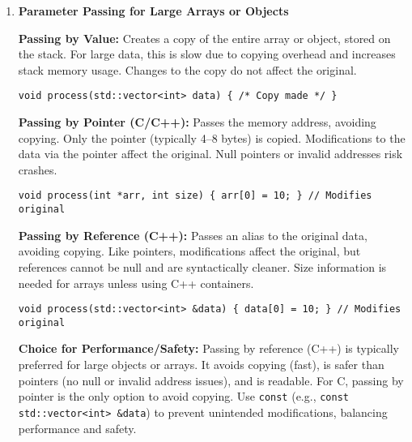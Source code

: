 \documentclass[a4paper,12pt]{article}
\begin{document}
\begin{enumerate}
\textbf{Header Files:} Prototypes are typically placed in header files (\texttt{.h}) to share declarations across multiple source files. The header is included in source files, and definitions are provided in one source file to avoid multiple definition errors.

\begin{lstlisting}
// sum.h
#ifndef SUM_H
#define SUM_H
int sum(int a, int b);
#endif

// sum.c
#include "sum.h"
int sum(int a, int b) {
    return a + b;
}

// main.c
#include "sum.h"
int main() {
    printf("%d\n", sum(3, 4));
    return 0;
}
\end{lstlisting}

\textbf{Forward Declarations:} Prototypes allow functions to call each other regardless of definition order within a file.

\textbf{Linking:} The linker combines object files, resolving function calls to their definitions. Missing definitions cause linker errors.

\item \textbf{Parameter Passing for Large Arrays or Objects}

\textbf{Passing by Value:} Creates a copy of the entire array or object, stored on the stack. For large data, this is slow due to copying overhead and increases stack memory usage. Changes to the copy do not affect the original.

\begin{lstlisting}
void process(std::vector<int> data) { /* Copy made */ }
\end{lstlisting}

\textbf{Passing by Pointer (C/C++):} Passes the memory address, avoiding copying. Only the pointer (typically 4–8 bytes) is copied. Modifications to the data via the pointer affect the original. Null pointers or invalid addresses risk crashes.

\begin{lstlisting}
void process(int *arr, int size) { arr[0] = 10; } // Modifies original
\end{lstlisting}

\textbf{Passing by Reference (C++):} Passes an alias to the original data, avoiding copying. Like pointers, modifications affect the original, but references cannot be null and are syntactically cleaner. Size information is needed for arrays unless using C++ containers.

\begin{lstlisting}
void process(std::vector<int> &data) { data[0] = 10; } // Modifies original
\end{lstlisting}

\textbf{Choice for Performance/Safety:} Passing by reference (C++) is typically preferred for large objects or arrays. It avoids copying (fast), is safer than pointers (no null or invalid address issues), and is readable. For C, passing by pointer is the only option to avoid copying. Use \texttt{const} (e.g., \verb|const std::vector<int> &data|) to prevent unintended modifications, balancing performance and safety.

\end{enumerate}
\end{document}
